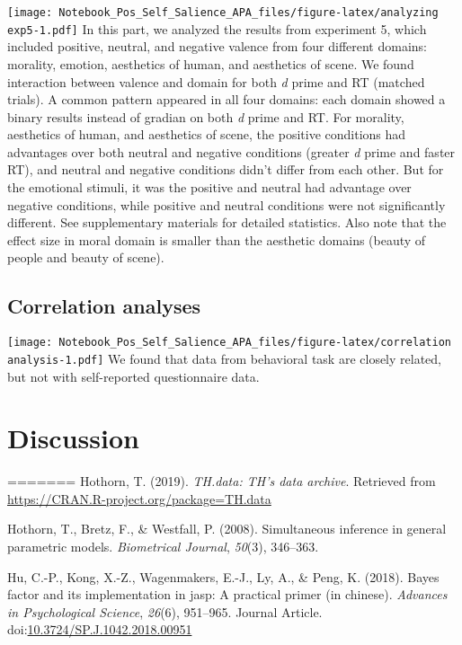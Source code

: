 \documentclass[
  man]{apa6}
\begin{document}
\texttt{[image: Notebook\_Pos\_Self\_Salience\_APA\_files/figure-latex/analyzing exp5-1.pdf]}
In this part, we analyzed the results from experiment 5, which included positive, neutral, and negative valence from four different domains: morality, emotion, aesthetics of human, and aesthetics of scene. We found interaction between valence and domain for both \emph{d} prime and RT (matched trials). A common pattern appeared in all four domains: each domain showed a binary results instead of gradian on both \emph{d} prime and RT. For morality, aesthetics of human, and aesthetics of scene, the positive conditions had advantages over both neutral and negative conditions (greater \emph{d} prime and faster RT), and neutral and negative conditions didn't differ from each other. But for the emotional stimuli, it was the positive and neutral had advantage over negative conditions, while positive and neutral conditions were not significantly different. See supplementary materials for detailed statistics. Also note that the effect size in moral domain is smaller than the aesthetic domains (beauty of people and beauty of scene).

\hypertarget{correlation-analyses}{%
\subsection{Correlation analyses}\label{correlation-analyses}}

\texttt{[image: Notebook\_Pos\_Self\_Salience\_APA\_files/figure-latex/correlation analysis-1.pdf]}
We found that data from behavioral task are closely related, but not with self-reported questionnaire data.

\hypertarget{discussion}{%
\section{Discussion}\label{discussion}}
=======
\leavevmode\hypertarget{ref-R-TH.data}{}%
Hothorn, T. (2019). \emph{TH.data: TH's data archive}. Retrieved from \url{https://CRAN.R-project.org/package=TH.data}

\leavevmode\hypertarget{ref-R-multcomp}{}%
Hothorn, T., Bretz, F., \& Westfall, P. (2008). Simultaneous inference in general parametric models. \emph{Biometrical Journal}, \emph{50}(3), 346--363.

\leavevmode\hypertarget{ref-Hu_2018_JASP}{}%
Hu, C.-P., Kong, X.-Z., Wagenmakers, E.-J., Ly, A., \& Peng, K. (2018). Bayes factor and its implementation in jasp: A practical primer (in chinese). \emph{Advances in Psychological Science}, \emph{26}(6), 951--965. Journal Article. doi:\href{https://doi.org/10.3724/SP.J.1042.2018.00951}{10.3724/SP.J.1042.2018.00951}
\end{document}

